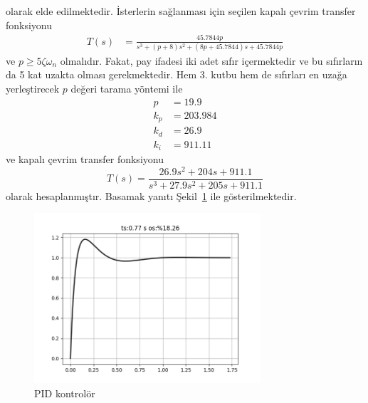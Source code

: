 olarak elde edilmektedir. İsterlerin sağlanması için seçilen kapalı çevrim transfer fonksiyonu
\begin{equation}
\begin{split}
    T(s)&=\frac{45.7844p}{s^3+(p+8)s^2+(8p+45.7844)s+45.7844p}
\end{split}
\end{equation}
ve $p\geq 5\zeta\omega_n$ olmalıdır. Fakat, pay ifadesi iki adet sıfır içermektedir ve bu sıfırların da 5 kat uzakta olması gerekmektedir. Hem 3. kutbu hem de sıfırları en uzağa yerleştirecek $p$ değeri tarama yöntemi ile
\begin{equation}
\begin{split}
    p&=19.9\\
    k_p&=203.984\\
    k_d&=26.9\\
    k_i&=911.11
\end{split}
\end{equation}
ve kapalı çevrim transfer fonksiyonu
\begin{equation}
    T(s)=\frac{26.9 s^2 + 204 s + 911.1}{s^3 + 27.9 s^2 + 205 s + 911.1}
\end{equation}
olarak hesaplanmıştır. Basamak yanıtı Şekil~\ref{fig:pid_kontrol} ile gösterilmektedir.
\begin{figure}[!htb]
    \centering
    \includegraphics[width=0.75\textwidth]{pid_kontrol}
    \caption{PID kontrolör}
    \label{fig:pid_kontrol}
\end{figure}